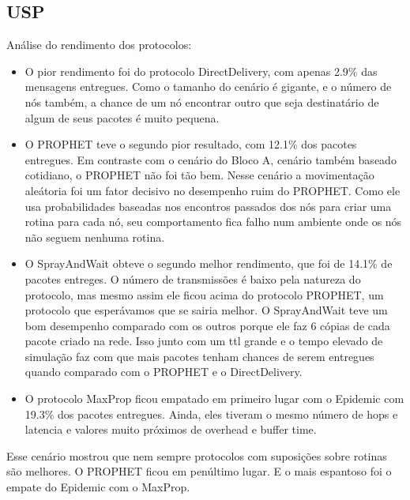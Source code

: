 \documentclass[conference]{IEEEtran}
\begin{document}
\subsection{USP}
  	Análise do rendimento dos protocolos:
  	\begin{itemize}
  	  \item O pior rendimento foi do protocolo DirectDelivery, com apenas 2.9\% das mensagens entregues.
			Como o tamanho do cenário é gigante, e o número de nós também, a chance de um nó encontrar
			outro que seja destinatário de algum de seus pacotes é muito pequena. 
			\item O PROPHET teve o segundo pior resultado, com 12.1\% dos pacotes entregues. Em contraste com o 
			cenário do Bloco A, cenário também baseado cotidiano, o PROPHET não foi tão bem. Nesse cenário
			a movimentação aleátoria foi um fator decisivo no desempenho ruim do PROPHET. Como ele usa
			probabilidades baseadas nos encontros passados dos nós para criar uma rotina para cada nó,
			seu comportamento fica falho num ambiente onde os nós não seguem nenhuma rotina.
			\item O SprayAndWait obteve o segundo melhor rendimento, que foi de 14.1\% de pacotes entreges. O número 
			de transmissões é baixo pela natureza do protocolo, mas mesmo assim ele ficou acima do protocolo 
			PROPHET, um protocolo que esperávamos que se sairia melhor. O SprayAndWait teve um bom desempenho
			comparado com os outros porque ele faz 6 cópias de cada pacote criado na rede. Isso junto com um
			ttl grande e o tempo elevado de simulação faz com que mais pacotes tenham chances de serem
			entregues quando comparado com o PROPHET e o DirectDelivery.
			\item O protocolo MaxProp ficou empatado em primeiro lugar com o Epidemic com 19.3\% dos pacotes
			entregues. Ainda, eles tiveram o mesmo número de hops e latencia e valores muito próximos
			de overhead e buffer time. 
  	\end{itemize}
  
  Esse cenário mostrou que nem sempre protocolos com suposições sobre rotinas são melhores. O PROPHET
ficou em penúltimo lugar. E o mais espantoso foi o empate do Epidemic com o MaxProp.			
\end{document}
